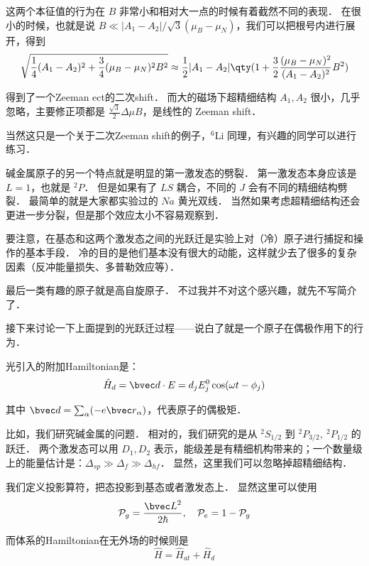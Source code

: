 这两个本征值的行为在 $B$ 非常小和相对大一点的时候有着截然不同的表现． 在很小的时候，也就是说 $B\ll|A_1-A_2| / \sqrt{3}(\mu_B-\mu_N)$，我们可以把根号内进行展开，得到
\begin{equation}
\sqrt{\frac{1}{4}(A_1-A_2)^2+\frac{3}{4}(\mu_B-\mu_N)^2B^2} \approx \frac{1}{2}|A_1-A_2| \qty(1+\frac{3}{2}\frac{(\mu_B-\mu_N)^2}{(A_1-A_2)^2}B^2)
\end{equation}

得到了一个Zeeman ect的二次shift． 而大的磁场下超精细结构 $A_1, A_2$ 很小，几乎忽略，主要修正项都是 $\frac{\sqrt{3}}{2}\Delta\mu B$，是线性的 Zeeman shift．

当然这只是一个关于二次Zeeman shift的例子，$^6{\text{Li}}$ 同理，有兴趣的同学可以进行练习．

碱金属原子的另一个特点就是明显的第一激发态的劈裂． 第一激发态本身应该是 $L=1$，也就是 $^2P$． 但是如果有了 $LS$ 耦合，不同的 $J$ 会有不同的精细结构劈裂． 最简单的就是大家都实验过的 $Na$ 黄光双线． 当然如果考虑超精细结构还会更进一步分裂，但是那个效应太小不容易观察到．

要注意，在基态和这两个激发态之间的光跃迁是实验上对（冷）原子进行捕捉和操作的基本手段． 冷的目的是他们基本没有很大的动能，这样就少去了很多的复杂因素（反冲能量损失、多普勒效应等）．

最后一类有趣的原子就是高自旋原子． 不过我并不对这个感兴趣，就先不写简介了．

接下来讨论一下上面提到的光跃迁过程——说白了就是一个原子在偶极作用下的行为．

光引入的附加Hamiltonian是：
\begin{equation}
\hat{H}_d = {\bvec d\cdot E} = d_j E_j^0 \cos(\omega t-\phi_j)
\end{equation}

其中 ${\bvec d} = \sum_\alpha (-e{\bvec r}_\alpha)$，代表原子的偶极矩．

比如，我们研究碱金属的问题． 相对的，我们研究的是从 $^2S_{1/2}$ 到 $^2P_{3/2},\ ^2P_{1/2}$ 的跃迁． 两个激发态可以用 $D_1,D_2$ 表示，能级差是有精细机构带来的；一个数量级上的能量估计是：$\Delta_{sp} \gg \Delta_f \gg \Delta_{hf}$． 显然，这里我们可以忽略掉超精细结构．

我们定义投影算符，把态投影到基态或者激发态上． 显然这里可以使用
\begin{equation}
\mathcal{P}_g = \frac{{\bvec L}^2}{2\hbar},\quad \mathcal{P}_e = 1 - \mathcal{P}_g
\end{equation}

而体系的Hamiltonian在无外场的时候则是
\begin{equation}
\hat{H} = \hat{H}_{at}+\hat{H}_d
\end{equation}

